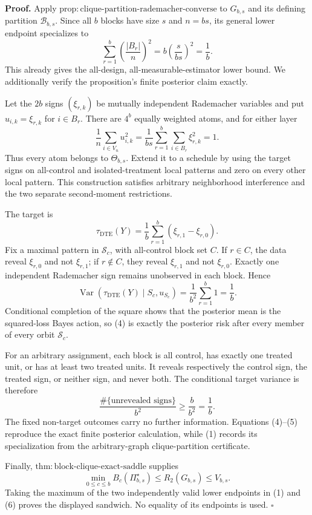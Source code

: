 \textbf{Proof.}
Apply \(\mathrm{prop{:}clique\text{-}partition\text{-}rademacher\text{-}converse}\) to \(G_{b,s}\) and its defining partition \(\mathcal B_{b,s}\). Since all \(b\) blocks have size \(s\) and \(n=bs\), its general lower endpoint specializes to
\[
\sum_{r=1}^b\left(\frac{|B_r|}{n}\right)^2
=b\left(\frac{s}{bs}\right)^2=\frac1b.
\tag{1}
\]
This already gives the all-design, all-measurable-estimator lower bound. We additionally verify the proposition's finite posterior claim exactly.

Let the \(2b\) signs \((\xi_{r,k})\) be mutually independent Rademacher variables and put \(u_{i,k}=\xi_{r,k}\) for \(i\in B_r\). There are \(4^b\) equally weighted atoms, and for either layer
\[
\frac1n\sum_{i\in V_n}u_{i,k}^2
=\frac1{bs}\sum_{r=1}^b\sum_{i\in B_r}\xi_{r,k}^2=1.
\tag{2}
\]
Thus every atom belongs to \(\Theta_{b,s}\). Extend it to a schedule by using the target signs on all-control and isolated-treatment local patterns and zero on every other local pattern. This construction satisfies arbitrary neighborhood interference and the two separate second-moment restrictions.

The target is
\[
\tau_{\mathrm{DTE}}(Y)=\frac1b\sum_{r=1}^b(\xi_{r,1}-\xi_{r,0}).
\tag{3}
\]
Fix a maximal pattern in \(\mathcal S_c\), with all-control block set \(C\). If \(r\in C\), the data reveal \(\xi_{r,0}\) and not \(\xi_{r,1}\); if \(r\notin C\), they reveal \(\xi_{r,1}\) and not \(\xi_{r,0}\). Exactly one independent Rademacher sign remains unobserved in each block. Hence
\[
\operatorname{Var}\!\left(\tau_{\mathrm{DTE}}(Y)\mid S_c,u_{S_c}\right)
=\frac1{b^2}\sum_{r=1}^b1=\frac1b.
\tag{4}
\]
Conditional completion of the square shows that the posterior mean is the squared-loss Bayes action, so (4) is exactly the posterior risk after every member of every orbit \(\mathcal S_c\).

For an arbitrary assignment, each block is all control, has exactly one treated unit, or has at least two treated units. It reveals respectively the control sign, the treated sign, or neither sign, and never both. The conditional target variance is therefore
\[
\frac{\#\{\text{unrevealed signs}\}}{b^2}\geq\frac b{b^2}=\frac1b.
\tag{5}
\]
The fixed non-target outcomes carry no further information. Equations (4)--(5) reproduce the exact finite posterior calculation, while (1) records its specialization from the arbitrary-graph clique-partition certificate.

Finally, \(\mathrm{thm{:}block\text{-}clique\text{-}exact\text{-}saddle}\) supplies
\[
\min_{0\leq c\leq b}B_c(\Pi_{b,s}^{\star})
\leq R_2(G_{b,s})\leq V_{b,s}.
\tag{6}
\]
Taking the maximum of the two independently valid lower endpoints in (1) and (6) proves the displayed sandwich. No equality of its endpoints is used. \(\square\)